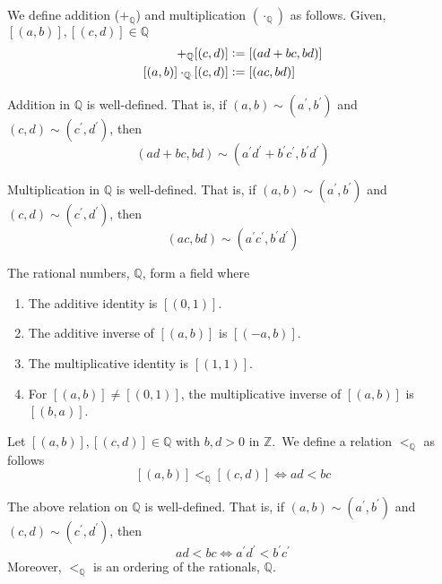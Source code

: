 \begin{defn}
    We define addition ($+_{\mathbb{Q}}$) and multiplication $(\cdot_{\mathbb{Q}})$ as follows. Given, $[(a,b)], [(c,d)] \in \mathbb{Q}$
\begin{align*}
    [(a,b)] +_{\mathbb{Q}} [(c,d)] &\vcentcolon= \left[ (ad + bc, bd) \right] \\
    [(a,b)] \cdot_{\mathbb{Q}} [(c,d)] &\vcentcolon= \left[ (ac, bd) \right]
\end{align*}
\end{defn}

\begin{theorem}
    Addition in $\mathbb{Q}$ is well-defined. That is, if $(a,b) \sim (a^{\prime}, b^{\prime})$ and $(c,d) \sim (c^{\prime}, d^{\prime})$, then
    \[
        (ad + bc, bd) \sim (a^{\prime}d^{\prime} + b^{\prime}c^{\prime}, b^{\prime}d^{\prime})
    \]
\end{theorem}

\begin{theorem}
    Multiplication in $\mathbb{Q}$ is well-defined. That is, if $(a,b) \sim (a^{\prime}, b^{\prime})$ and $(c,d) \sim (c^{\prime}, d^{\prime})$, then
    \[
        (ac, bd) \sim (a^{\prime}c^{\prime}, b^{\prime}d^{\prime})
    \]
\end{theorem}

\begin{theorem}
    The rational numbers, $\mathbb{Q}$, form a field where 
    \begin{enumerate}
        \item The additive identity is $[(0,1)]$.
        \item The additive inverse of $[(a,b)]$ is $[(-a,b)]$.
        \item The multiplicative identity is $[(1,1)]$.
        \item For $[(a,b)] \neq [(0,1)]$, the multiplicative inverse of $[(a,b)]$ is $[(b,a)]$.
    \end{enumerate}
\end{theorem}

\begin{defn}[Order]
    Let $[(a,b)], [(c,d)] \in \mathbb{Q}$ with $b,d > 0$ in $\mathbb{Z}$.\footnotemark\ We define a relation $<_{\mathbb{Q}}$ as follows
    \[
        [(a,b)] <_\mathbb{Q} [(c,d)] \iff ad < bc
    \]
\end{defn}
\begin{theorem}
    The above relation on $\mathbb{Q}$ is well-defined. That is, if $(a,b) \sim (a^{\prime}, b^{\prime})$ and $(c,d) \sim (c^{\prime}, d^{\prime})$, then
    \[
        ad < bc \iff a^{\prime} d^{\prime} < b^{\prime} c^{\prime}
    \]
    Moreover, $<_{\mathbb{Q}}$ is an ordering of the rationals, $\mathbb{Q}$.
\end{theorem}